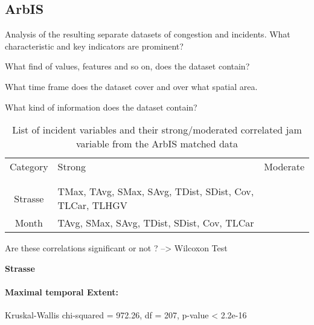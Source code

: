 \subsection{ArbIS}

Analysis of the resulting separate datasets of congestion and incidents. What characteristic and key indicators are prominent?

What find of values, features and so on, does the dataset contain?

What time frame does the dataset cover and over what spatial area.

What kind of information does the dataset contain?

\noindent
\begin{table}[h!]
	\centering
	\begin{tabular}{c|l|l}  
		Category & Strong & Moderate \\
		\\[-1em]
		\hline
		\\[-1em]
		Strasse & TMax, TAvg, SMax, SAvg, TDist, SDist, Cov, TLCar, TLHGV & \\ 
 		Month & TAvg, SMax, SAvg, TDist, SDist, Cov, TLCar & \\
	\end{tabular}
	\caption{List of incident variables and their strong/moderated correlated jam variable from the ArbIS matched data}
\end{table}

Are these correlations significant or not ? --> Wilcoxon Test

\Large
\centerline{\textbf{Strasse}}
\normalsize

\paragraph{Maximal temporal Extent:}
Kruskal-Wallis chi-squared = 972.26, df = 207, p-value < 2.2e-16

